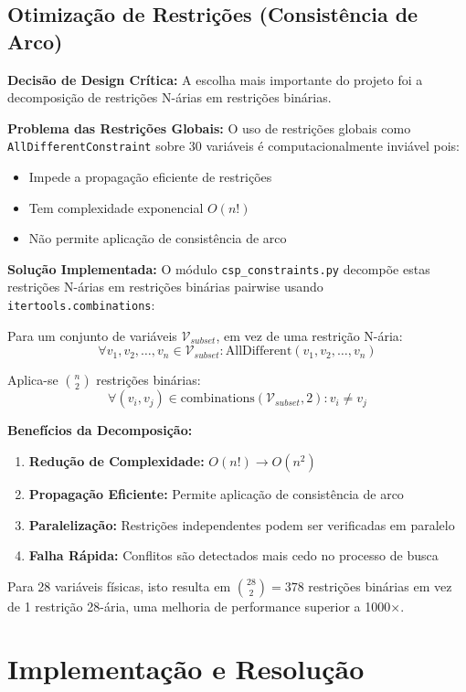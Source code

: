 \documentclass[a4paper, 12pt]{article}
\begin{document}
\subsection{Otimização de Restrições (Consistência de Arco)}

\textbf{Decisão de Design Crítica:} A escolha mais importante do projeto foi a decomposição de restrições N-árias em restrições binárias.

\textbf{Problema das Restrições Globais:} O uso de restrições globais como \texttt{AllDifferentConstraint} sobre 30 variáveis é computacionalmente inviável pois:
\begin{itemize}
    \item Impede a propagação eficiente de restrições
    \item Tem complexidade exponencial $O(n!)$
    \item Não permite aplicação de consistência de arco
\end{itemize}

\textbf{Solução Implementada:} O módulo \texttt{csp\_constraints.py} decompõe estas restrições N-árias em restrições binárias pairwise usando \texttt{itertools.combinations}:

Para um conjunto de variáveis $\mathcal{V}_{subset}$, em vez de uma restrição N-ária:
$$\forall v_1, v_2, \ldots, v_n \in \mathcal{V}_{subset}: \text{AllDifferent}(v_1, v_2, \ldots, v_n)$$

Aplica-se $\binom{n}{2}$ restrições binárias:
$$\forall (v_i, v_j) \in \text{combinations}(\mathcal{V}_{subset}, 2): v_i \neq v_j$$

\textbf{Benefícios da Decomposição:}
\begin{enumerate}
    \item \textbf{Redução de Complexidade:} $O(n!) \rightarrow O(n^2)$
    \item \textbf{Propagação Eficiente:} Permite aplicação de consistência de arco
    \item \textbf{Paralelização:} Restrições independentes podem ser verificadas em paralelo
    \item \textbf{Falha Rápida:} Conflitos são detectados mais cedo no processo de busca
\end{enumerate}

Para 28 variáveis físicas, isto resulta em $\binom{28}{2} = 378$ restrições binárias em vez de 1 restrição 28-ária, uma melhoria de performance superior a 1000×.

\section{Implementação e Resolução}
\end{document}
